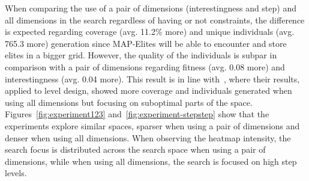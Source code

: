

When comparing the use of a pair of dimensions (interestingness and step) and all dimensions in the search regardless of having or not constraints, the difference is expected regarding coverage (avg. 11.2\% more) and unique individuals (avg. 765.3 more) generation since MAP-Elites will be able to encounter and store elites in a bigger grid. However, the quality of the individuals is subpar in comparison with a pair of dimensions regarding fitness (avg. 0.08 more) and interestingness (avg. 0.04 more). This result is in line with~, where their results, applied to level design, showed more coverage and individuals generated when using all dimensions but focusing on suboptimal parts of the space. Figures~\ref{fig:experiment123} and~\ref{fig:experiment-stepstep} show that the experiments explore similar spaces, sparser when using a pair of dimensions and denser when using all dimensions. When observing the heatmap intensity, the search focus is distributed across the search space when using a pair of dimensions, while when using all dimensions, the search is focused on high step levels.


